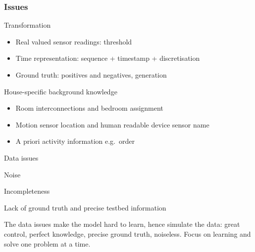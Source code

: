 \documentclass[10pt]{beamer}
\begin{document}
\begin{frame}[plain]
  \frametitle{Issues}

  \begin{block}{Transformation}
    \begin{itemize}
      \item Real valued sensor readings: threshold
      \item Time representation: sequence + timestamp + discretisation
      \item Ground truth: positives and negatives, generation
    \end{itemize}
  \end{block}

  \begin{block}{House-specific background knowledge}
    \begin{itemize}
      \item Room interconnections and bedroom assignment
      \item Motion sensor location and human readable device sensor name
      \item A priori activity information e.g.\ order
    \end{itemize}
  \end{block}

  \begin{block}{Data issues}
    \begin{itemize}
      \item Noise {\setlength{\itemindent}{8em}\vspace*{-1.5em}\item Incompleteness}
      \item Lack of ground truth and precise testbed information
    \end{itemize}
  \end{block}

The data issues make the model hard to learn, hence simulate the data: great control, perfect knowledge, precise ground truth, noiseless. Focus on learning and solve one problem at a time.

\end{frame}
\end{document}
